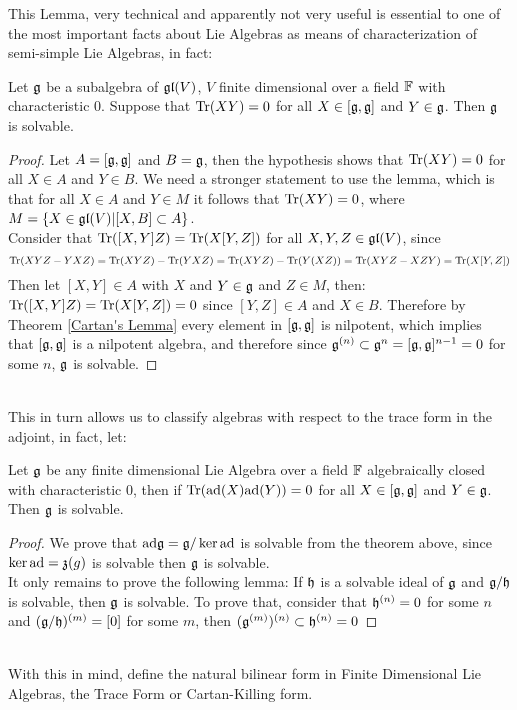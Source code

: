 This Lemma, very technical and apparently not very useful is essential to one of the most important facts about Lie Algebras as means of characterization of semi-simple Lie Algebras, in fact:
\begin{teo}
	Let $\mathfrak{g}$ be a subalgebra of $\mathfrak{gl}(V)$, $V$ finite dimensional over a field $\mathbb{F}$ with characteristic $0$. Suppose that $\text{Tr}(XY)=0$ for all $X \in [\mathfrak{g},\mathfrak{g}]$ and $Y \in \mathfrak{g}$. Then $\mathfrak{g}$ is solvable.
	\label{Cartan's Criterion}
\end{teo}
\begin{proof}
	Let $A=[\mathfrak{g},\mathfrak{g}]$ and $B=\mathfrak{g}$, then the hypothesis shows that $\text{Tr}(XY)=0$ for all $X \in A$ and $Y \in B$. We need a stronger statement to use the lemma, which is that for all $X \in A$ and $Y \in M$ it follows that $\text{Tr}(XY)=0$, where $M=\{X \in \mathfrak{gl}(V)| [X,B]\subset A\}$.\\
	Consider that $\text{Tr}([X,Y]Z)=\text{Tr}(X[Y,Z])$ for all $X,Y,Z \in \mathfrak{gl}(V)$, since $$\text{Tr}(XYZ - YXZ) = \text{Tr}(XYZ)-\text{Tr}(YXZ) = \text{Tr}(XYZ)-\text{Tr}(Y(XZ)) = \text{Tr}(XYZ-XZY) = \text{Tr}(X[Y,Z])$$
	Then let $[X,Y] \in A$ with $X$ and $Y \in \mathfrak{g}$ and $Z \in M$, then:$\text{Tr}([X,Y]Z)=\text{Tr}(X[Y,Z])=0$ since $[Y,Z] \in A$ and $X \in B$. Therefore by Theorem \ref{Cartan's Lemma} every element in $[\mathfrak{g},\mathfrak{g}]$ is nilpotent, which implies that $[\mathfrak{g},\mathfrak{g}]$ is a nilpotent algebra, and therefore since $\mathfrak{g}^{(n)}\subset \mathfrak{g}^n = [\mathfrak{g},\mathfrak{g}]^{n-1}=0$ for some $n$, $\mathfrak{g}$ is solvable.
\end{proof}\\
This in turn allows us to classify algebras with respect to the trace form in the adjoint, in fact, let:
\begin{corol}
	Let $\mathfrak{g}$ be any finite dimensional Lie Algebra over a field $\mathbb{F}$ algebraically closed with characteristic $0$, then if $\text{Tr}(\text{ad}(X) \text{ad}(Y))=0$ for all $X \in [\mathfrak{g},\mathfrak{g}]$ and $Y \in \mathfrak{g}$. Then $\mathfrak{g}$ is solvable.
	\label{Corollary}
\end{corol}
\begin{proof}
	We prove that $\text{ad} \mathfrak{g} = \mathfrak{g}/\ker \text{ad}$ is solvable from the theorem above, since $\ker \text{ad} = \mathfrak{z}(g)$ is solvable then $\mathfrak{g}$ is solvable.\\
	It only remains to prove the following lemma: If $\mathfrak{h}$ is a solvable ideal of $\mathfrak{g}$ and $\mathfrak{g}/\mathfrak{h}$ is solvable, then $\mathfrak{g}$ is solvable. To prove that, consider that $\mathfrak{h}^{(n)} = 0$ for some $n$ and $(\mathfrak{g}/\mathfrak{h})^{(m)} = [0]$ for some $m$, then $(\mathfrak{g}^{(m)})^{(n)} \subset \mathfrak{h}^{(n)} = 0$
\end{proof}\\
With this in mind, define the natural bilinear form in Finite Dimensional Lie Algebras, the Trace Form or Cartan-Killing form.
